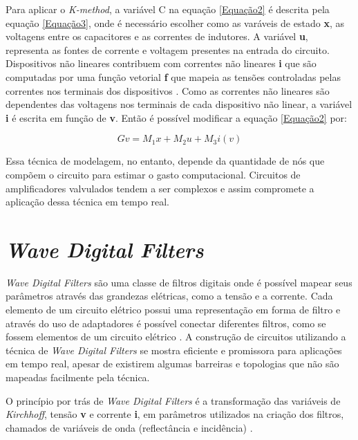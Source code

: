 Para aplicar o \textit{K-method}, a variável C na equação \ref{Equação2} é descrita pela equação \ref{Equação3}, onde é necessário escolher como as varáveis de estado \textbf{x}, as voltagens entre os capacitores e as correntes de indutores. A variável \textbf{u}, representa as fontes de corrente e voltagem presentes na entrada do circuito. Dispositivos não lineares contribuem com correntes não lineares \textbf{i} que são computadas por uma função vetorial \textbf{f} que mapeia as tensões controladas pelas correntes nos terminais dos dispositivos \cite{yeh2010automated1}. Como as correntes não lineares são dependentes das voltagens nos terminais de cada dispositivo não linear, a variável \textbf{i} é escrita em função de \textbf{v}. Então é possível modificar a equação \ref{Equação2} por:

\begin{equation}
Gv = M_{1}x + M_{2}u + M_{3}i(v) 
\label{Equação4}
\end{equation}

Essa técnica de modelagem, no entanto, depende da quantidade de nós que compõem o circuito para estimar o gasto computacional. Circuitos de amplificadores valvulados tendem a ser complexos e assim compromete a aplicação dessa técnica em tempo real.

\section*{\textit{Wave Digital Filters}}
\textit{Wave Digital Filters} são uma classe de filtros digitais onde é possível mapear seus parâmetros através das grandezas elétricas, como a tensão e a corrente. Cada elemento de um circuito elétrico possui uma representação em forma de filtro e através do uso de adaptadores é possível conectar diferentes filtros, como se fossem elementos de um circuito elétrico \cite{pakarinen2009review}. A construção de circuitos utilizando a técnica de \textit{Wave Digital Filters} se mostra eficiente e promissora para aplicações em tempo real, apesar de existirem algumas barreiras e topologias que não são mapeadas facilmente pela técnica.

O princípio por trás de \textit{Wave Digital Filters} é a transformação das variáveis de \textit{Kirchhoff}, tensão \textbf{v} e corrente \textbf{i}, em parâmetros utilizados na criação dos filtros, chamados de variáveis de onda (reflectância e incidência) \cite{2012Macak}.

